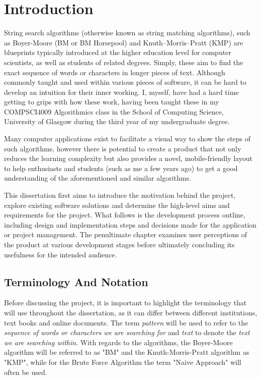 \chapter{Introduction}



String search algorithms (otherwise known as string matching algorithms), such as Boyer-Moore (BM or BM Horsepool) and Knuth–Morris–Pratt (KMP) are blueprints typically introduced at the higher education level for computer scientists, as well as students of related degrees. Simply, these aim to find the exact sequence of words or characters in longer pieces of text. Although commonly taught and used within various pieces of software, it can be hard to develop an intuition for their inner working. I, myself, have had a hard time getting to grips with how these work, having been taught these in my COMPSCI4009 Algorithmics  class in the School of Computing Science, University of Glasgow during the third year of my undergraduate degree.

Many computer applications exist to facilitate a visual way to show the steps of such algorithms, however there is potential to create a product that not only reduces the learning complexity but also provides a novel, mobile-friendly layout to help enthusiasts and students (such as me a few years ago) to get a good understanding of the aforementioned and similar algorithms.

This dissertation first aims to introduce the motivation behind the project,  explore existing software solutions and determine the high-level aims and requirements for the project. What follows is the development process outline, including design and implementation steps and decisions made for the application or project management. The penultimate chapter examines user perceptions of the product at various development stages  before ultimately concluding its usefulness for the intended audience.


\section{Terminology And Notation}

Before discussing the project, it is important to highlight the terminology that will use throughout the dissertation, as it can differ between different institutions, text books and online documents.  The term \emph{pattern} will be used to refer to the \emph{sequence of words or characters we are searching for} and \emph{text} to denote the \emph{text we are searching within}. With regards to the algorithms, the Boyer-Moore algorithm will be referred to as "BM" and the Knuth-Morris-Pratt algorithm as "KMP", while for the Brute Force Algorithm the term "Naive Approach" will often be used.

